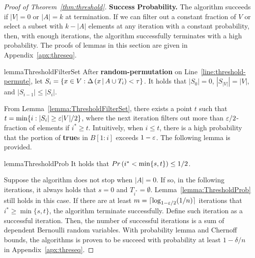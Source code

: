 \begin{proof}[Proof of Theorem~\ref{thm:threshold}]
	\textbf{Success Probability.}
	The algorithm succeeds if $|V|=0$ or $|A|=k$ at termination.
	If we can filter out a constant fraction of $V$ or select
	a subset with $k-|A|$ elements at any iteration with a 
	constant probability, then, with enough iterations,
	the algorithm successfully terminates with a high probability.
	The proofs of lemmas in this section are given in Appendix~\ref{apx:threseq}.
	\begin{restatable}{lemma}{ThresholdFilterSet}
		\label{lemma:ThresholdFilterSet}
        After \textbf{random-permutation} on Line~\ref{line:threshold-permute},
        let $S_i=\{x \in V: \Delta \left( x \, | \, A\cup T_i \right) < \tau\}$.
        It holds that $|S_0|=0$, $|S_{|V|}|=|V|$, and $|S_{i-1}| \le |S_i|$.
	\end{restatable}
	From Lemma~\ref{lemma:ThresholdFilterSet},
	there exists a point $t$ such that
	$t = \min \{i: |S_i| \ge \varepsilon |V|/2\}$,
	where the next iteration filters out more than
	$\varepsilon/2$-fraction of elements if $i^* \ge t$.
	Intuitively, when $i \le t$, there is a high
	probability that
	the portion of \textbf{true}s in $B[1:i]$
	exceeds $1-\varepsilon$.
	The following lemma is provided.
	\begin{restatable}{lemma}{ThresholdProb} 
		\label{lemma:ThresholdProb}
		It holds that $Pr \left( i^*<\min\{s, t\} \right) \le 1/2$.
	\end{restatable}

	Suppose the algorithm does not stop when $|A| = 0$.
	If so, in the following iterations,
	it always holds that $s = 0$ and $T_{i^*}=\emptyset$.
	Lemma~\ref{lemma:ThresholdProb} still holds in this case.
	If there are at least $m=\lceil\log_{1-\varepsilon/2}(1/n) \rceil$ 
	iterations that $i^* \ge \min\{s, t\}$, the algorithm terminate successfully.
	Define such iteration as a successful iteration.
	Then, the number of successful iterations is a sum of dependent
	Bernoulli random variables. 
	With probability lemma and Chernoff bounds,
	the algorithms is proven to be succeed with probability at least
	$1-\delta/n$ in Appendix~\ref{apx:threseq}.


\end{proof}
